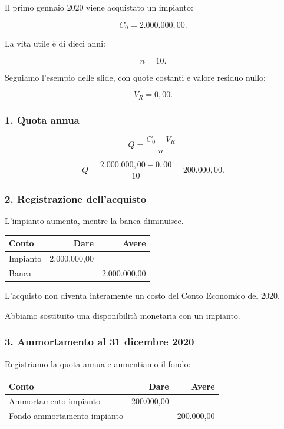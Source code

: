 \noindent Il primo gennaio 2020
viene acquistato un impianto:

\[
C_0=2.000.000{,}00.
\]

\noindent La vita utile è di dieci anni:

\[
n=10.
\]

\noindent Seguiamo l'esempio delle slide,
con quote costanti
e valore residuo nullo:

\[
V_R=0{,}00.
\]


\subsubsection*{1. Quota annua}

\[
Q=\frac{C_0-V_R}{n}.
\]

\[
Q=
\frac{2.000.000{,}00-0{,}00}{10}
=
\boxed{200.000{,}00}.
\]


\subsubsection*{2. Registrazione dell'acquisto}

\noindent L'impianto aumenta,
mentre la banca diminuisce.

\begin{center}
    \begin{tabular}{|l|r|r|}
        \hline
        \textbf{Conto}
        & \textbf{Dare}
        & \textbf{Avere} \\
        \hline
        Impianto
        & 2.000.000,00 & \\
        Banca
        & & 2.000.000,00 \\
        \hline
    \end{tabular}
\end{center}

\noindent L'acquisto non diventa
interamente un costo
del Conto Economico del 2020.

\noindent Abbiamo sostituito
una disponibilità monetaria
con un impianto.


\subsubsection*{3. Ammortamento al 31 dicembre 2020}

\noindent Registriamo la quota annua
e aumentiamo il fondo:

\begin{center}
    \begin{tabular}{|l|r|r|}
        \hline
        \textbf{Conto}
        & \textbf{Dare}
        & \textbf{Avere} \\
        \hline
        Ammortamento impianto
        & 200.000,00 & \\
        Fondo ammortamento impianto
        & & 200.000,00 \\
        \hline
    \end{tabular}
\end{center}

